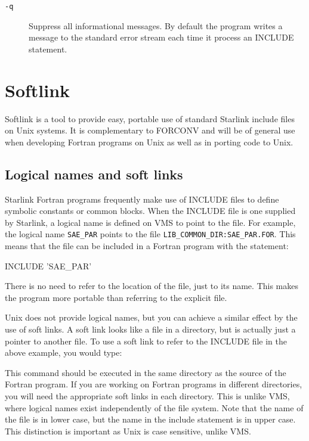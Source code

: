 \documentclass[11pt,nolof]{starlink}
\begin{document}
\begin{description}
\item[\texttt{-q}] Suppress all informational messages. By default the
program writes a message to the standard error stream each time it
process an INCLUDE statement.

\end{description}

\section{Softlink}

Softlink is a tool to provide easy, portable use of standard Starlink include
files on Unix systems. It is complementary to FORCONV and will be of general
use when developing Fortran programs on Unix as well as in porting code to
Unix.

\subsection{Logical names and soft links}

Starlink Fortran programs frequently make use of INCLUDE files to define
symbolic constants or common blocks. When the INCLUDE file is one supplied by
Starlink, a logical name is defined on VMS to point to the file. For example,
the logical name \texttt{SAE\_PAR} points to the file \texttt{LIB\_COMMON\_DIR:SAE\_PAR.FOR}. This means that the file can be included in a
Fortran program with the statement:

\begin{terminalv}
INCLUDE 'SAE_PAR'
\end{terminalv}

There is no need to refer to the location of the file, just to its name. This
makes the program more portable than referring to the explicit file.

Unix does not provide logical names, but you can achieve a similar effect by
the use of soft links. A soft link looks like a file in a directory, but is
actually just a pointer to another file. To use a soft link to refer to the
INCLUDE file in the above example, you would type:

\begin{terminalv}
\end{terminalv}

This command should be executed in the same directory as the source of the
Fortran program. If you are working on Fortran programs in different
directories, you will need the appropriate soft links in each directory. This
is unlike VMS, where logical names exist independently of the file system. Note
that the name of the file is in lower case, but the name in the include
statement is in upper case. This distinction is important as Unix is case
sensitive, unlike VMS.
\end{document}
